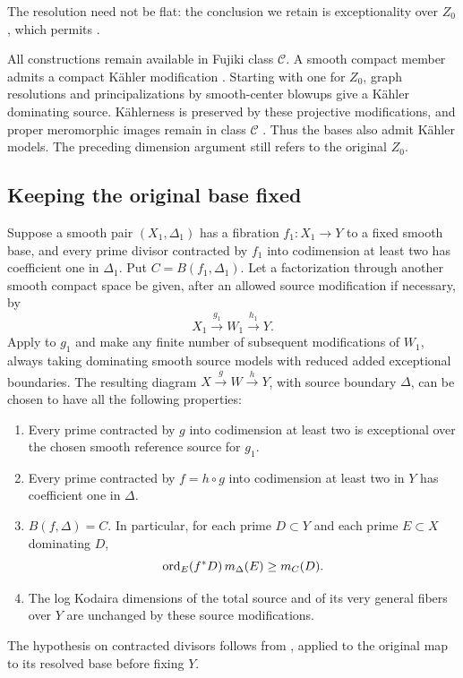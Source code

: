 The resolution need not be flat: the conclusion we retain is
exceptionality over $Z_0$, which permits
.

All constructions remain available in Fujiki class $\mathcal C$.
A smooth compact member admits a compact K\"ahler modification
\cite[Theorems~0.7 and~3.4]{DemaillyPaun2004}. Starting with one for
$Z_0$, graph resolutions and principalizations by smooth-center blowups
give a K\"ahler dominating source. K\"ahlerness is preserved by these
projective modifications, and proper meromorphic images remain in
class $\mathcal C$ \cite[Lemmas~4.4 and~4.6\textup{(3)}]{FujikiDouady}.
Thus the bases also admit K\"ahler models. The preceding dimension
argument still refers to the original $Z_0$.

\subsection{Keeping the original base fixed}

\begin{corollary}\label{setup:simultaneous}
Suppose a smooth pair $(X_1,\Delta_1)$ has a fibration $f_1:X_1\to Y$
to a fixed smooth base, and every prime divisor contracted by $f_1$ into
codimension at least two has coefficient one in $\Delta_1$. Put
$C=B(f_1,\Delta_1)$. Let a factorization through another smooth compact
space be given, after an allowed source modification if necessary, by
\[
 X_1\xrightarrow{g_1}W_1\xrightarrow{h_1}Y.
\]
Apply  to $g_1$ and make any finite number of
subsequent modifications of $W_1$, always taking dominating smooth
source models with reduced added exceptional boundaries. The resulting
diagram $X\xrightarrow{g}W\xrightarrow{h}Y$, with source boundary
$\Delta$, can be chosen to have all the following properties:
\begin{enumerate}[label=\textup{(\roman*)}]
\item Every prime contracted by $g$ into codimension at least two is
exceptional over the chosen smooth reference source for $g_1$.
\item Every prime contracted by $f=h\circ g$ into codimension at least
two in $Y$ has coefficient one in $\Delta$.
\item $B(f,\Delta)=C$. In particular, for each prime $D\subset Y$ and
each prime $E\subset X$ dominating $D$,
\begin{equation}\label{setup:retained-multiplicity}
 \operatorname{ord}_E(f^*D)\,m_\Delta(E)\geq m_C(D).
\end{equation}
\item The log Kodaira dimensions of the total source and of its very
general fibers over $Y$ are unchanged by these source modifications.
\end{enumerate}
The hypothesis on contracted divisors follows from
, applied to the original map to its resolved
base before fixing $Y$.
\end{corollary}

